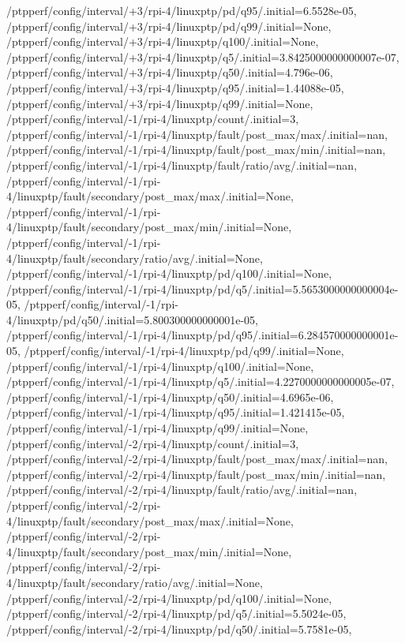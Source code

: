 {    /ptpperf/config/interval/+3/rpi-4/linuxptp/pd/q95/.initial=6.5528e-05,
    /ptpperf/config/interval/+3/rpi-4/linuxptp/pd/q99/.initial=None,
    /ptpperf/config/interval/+3/rpi-4/linuxptp/q100/.initial=None,
    /ptpperf/config/interval/+3/rpi-4/linuxptp/q5/.initial=3.8425000000000007e-07,
    /ptpperf/config/interval/+3/rpi-4/linuxptp/q50/.initial=4.796e-06,
    /ptpperf/config/interval/+3/rpi-4/linuxptp/q95/.initial=1.44088e-05,
    /ptpperf/config/interval/+3/rpi-4/linuxptp/q99/.initial=None,
    /ptpperf/config/interval/-1/rpi-4/linuxptp/count/.initial=3,
    /ptpperf/config/interval/-1/rpi-4/linuxptp/fault/post_max/max/.initial=nan,
    /ptpperf/config/interval/-1/rpi-4/linuxptp/fault/post_max/min/.initial=nan,
    /ptpperf/config/interval/-1/rpi-4/linuxptp/fault/ratio/avg/.initial=nan,
    /ptpperf/config/interval/-1/rpi-4/linuxptp/fault/secondary/post_max/max/.initial=None,
    /ptpperf/config/interval/-1/rpi-4/linuxptp/fault/secondary/post_max/min/.initial=None,
    /ptpperf/config/interval/-1/rpi-4/linuxptp/fault/secondary/ratio/avg/.initial=None,
    /ptpperf/config/interval/-1/rpi-4/linuxptp/pd/q100/.initial=None,
    /ptpperf/config/interval/-1/rpi-4/linuxptp/pd/q5/.initial=5.5653000000000004e-05,
    /ptpperf/config/interval/-1/rpi-4/linuxptp/pd/q50/.initial=5.800300000000001e-05,
    /ptpperf/config/interval/-1/rpi-4/linuxptp/pd/q95/.initial=6.284570000000001e-05,
    /ptpperf/config/interval/-1/rpi-4/linuxptp/pd/q99/.initial=None,
    /ptpperf/config/interval/-1/rpi-4/linuxptp/q100/.initial=None,
    /ptpperf/config/interval/-1/rpi-4/linuxptp/q5/.initial=4.2270000000000005e-07,
    /ptpperf/config/interval/-1/rpi-4/linuxptp/q50/.initial=4.6965e-06,
    /ptpperf/config/interval/-1/rpi-4/linuxptp/q95/.initial=1.421415e-05,
    /ptpperf/config/interval/-1/rpi-4/linuxptp/q99/.initial=None,
    /ptpperf/config/interval/-2/rpi-4/linuxptp/count/.initial=3,
    /ptpperf/config/interval/-2/rpi-4/linuxptp/fault/post_max/max/.initial=nan,
    /ptpperf/config/interval/-2/rpi-4/linuxptp/fault/post_max/min/.initial=nan,
    /ptpperf/config/interval/-2/rpi-4/linuxptp/fault/ratio/avg/.initial=nan,
    /ptpperf/config/interval/-2/rpi-4/linuxptp/fault/secondary/post_max/max/.initial=None,
    /ptpperf/config/interval/-2/rpi-4/linuxptp/fault/secondary/post_max/min/.initial=None,
    /ptpperf/config/interval/-2/rpi-4/linuxptp/fault/secondary/ratio/avg/.initial=None,
    /ptpperf/config/interval/-2/rpi-4/linuxptp/pd/q100/.initial=None,
    /ptpperf/config/interval/-2/rpi-4/linuxptp/pd/q5/.initial=5.5024e-05,
    /ptpperf/config/interval/-2/rpi-4/linuxptp/pd/q50/.initial=5.7581e-05,
}
